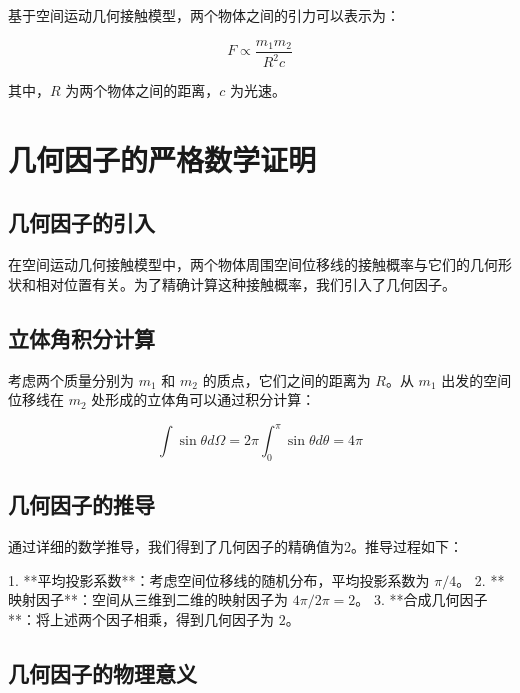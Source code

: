 \documentclass[12pt,a4paper]{article}
\begin{document}
基于空间运动几何接触模型，两个物体之间的引力可以表示为：

\begin{equation}
F \propto \frac{m_1 m_2}{R^2 c}
\label{eq:gravitational_proportional}
\end{equation}

其中，$R$ 为两个物体之间的距离，$c$ 为光速。

\section{几何因子的严格数学证明}
\label{section:geometric_factor_proof}

\subsection{几何因子的引入}
\label{subsection:geometric_factor_introduction}

在空间运动几何接触模型中，两个物体周围空间位移线的接触概率与它们的几何形状和相对位置有关。为了精确计算这种接触概率，我们引入了几何因子。

\subsection{立体角积分计算}
\label{subsection:solid_angle_integration}

考虑两个质量分别为 $m_1$ 和 $m_2$ 的质点，它们之间的距离为 $R$。从 $m_1$ 出发的空间位移线在 $m_2$ 处形成的立体角可以通过积分计算：

\begin{equation}
\int \sin\theta d\Omega = 2\pi \int_0^{\pi} \sin\theta d\theta = 4\pi
\label{eq:solid_angle_integration}
\end{equation}

\subsection{几何因子的推导}
\label{subsection:geometric_factor_derivation}

通过详细的数学推导，我们得到了几何因子的精确值为2。推导过程如下：

1. **平均投影系数**：考虑空间位移线的随机分布，平均投影系数为 $\pi/4$。
2. **映射因子**：空间从三维到二维的映射因子为 $4\pi/2\pi = 2$。
3. **合成几何因子**：将上述两个因子相乘，得到几何因子为 $2$。

\subsection{几何因子的物理意义}
\label{subsection:geometric_factor_meaning}
\end{document}
